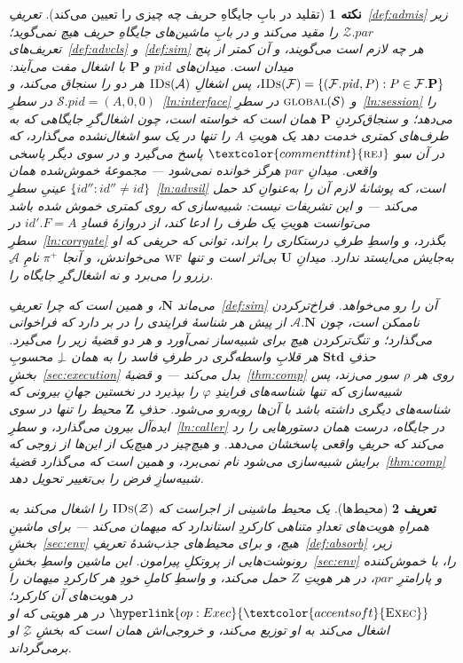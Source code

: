\documentclass[10pt,oneside,openany]{book}
\newcommand{\Ps}{\mathbf{P}}
\newcommand{\PID}{\mathit{pid}}
\newcommand{\admits}{\mathbf{N}}
\newcommand{\Zpid}{\mathbf{Z}}
\newcommand{\Stdpid}{\mathbf{Std}}
\newcommand{\pars}{\mathit{par}}
\newcommand{\uses}{\mathbf{U}}
\newcommand{\WF}{\op{wf}}
\newcommand{\F}{\mathcal{F}}
\newcommand{\Zenv}{\mathcal{Z}}
\newcommand{\Adv}{\mathcal{A}}
\newcommand{\Sim}{\mathcal{S}}
\newcommand{\op}[1]{\textnormal{\textsc{#1}}}
\newcommand{\opl}[1]{\hyperlink{op:#1}{\textcolor{accentsoft}{\op{#1}}}}
\newcommand{\IDs}{\op{IDs}}
\newcommand{\id}{id}
\newcommand{\atom}[1]{\textcolor{commenttint}{\op{#1}}}
\newcommand{\rej}{\atom{rej}}
\newcommand{\none}{\bot}
\theoremstyle{accentdef}
\newtheorem{definition}{تعریف}[chapter]
\newtheorem{remark}[definition]{نکته}
\theoremstyle{accentplain}
\begin{document}
\begin{remark}[تقلید در بابِ جایگاهِ حریف چه چیزی را تعیین می‌کند]\label{rem:advpars}
تعریفِ~\ref{def:admis}ِ زیر $\Zenv.\pars$ را مقید می‌کند و در بابِ
ماشین‌های جایگاهِ حریف هیچ نمی‌گوید؛ تعریف‌های~\ref{def:advcls}
و~\ref{def:sim} هر چه لازم است می‌گویند، و آن کمتر از پنج میدان است.
میدان‌های $\PID$ و $\Ps$ با اشغال مفت می‌آیند: $\IDs(\F) = \{(\F.\PID,P)
: P \in \F.\Ps\}$، پس اشغالِ $\IDs(\Adv)$ هر دو را سنجاق می‌کند، و
$\Sim.\PID = (A,0,0)$ در سطرِ~\ref{ln:interface} و $\op{global}(\Sim)$ در
سطرِ~\ref{ln:session} را می‌دهد؛ و سنجاق‌کردنِ $\Ps$ همان است که خواسته
است، چون اشغال‌گرِ جایگاهی که به طرف‌های کمتری خدمت دهد یک هویتِ $A$ را
تنها در یک سو اشغال‌نشده می‌گذارد، که در آن سو $\rej$ پاسخ می‌گیرد و در
سوی دیگر پاسخی واقعی. میدانِ $\pars$ هرگز خوانده نمی‌شود --- مجموعهٔ
خموش‌شده همان $\{\id'' : \id'' \neq \id\}$ِ عینیِ سطرِ~\ref{ln:advsil}
است، که پوشانهٔ لازم آن را به‌عنوانِ کد حمل می‌کند --- و این تشریفات
نیست: شبیه‌سازی که روی \emph{کمتری} خموش شده باشد می‌توانست هویتِ یک طرف
را ادعا کند، از دروازهٔ فسادِ $\id'.F = A$ در سطرِ~\ref{ln:corrgate}
بگذرد، و واسطِ طرفِ درستکاری را براند، توانی که حریفی که او به‌جایش
می‌ایستد ندارد. میدانِ $\uses$ بی‌اثر است و تنها $\WF$ می‌خواندش، و آنجا
$\pi^{+}$ نامِ $\Adv$ِ رزرو را می‌برد و نه اشغال‌گرِ جایگاه را.

می‌ماند $\admits$، و همین است که چرا تعریفِ~\ref{def:sim} آن را رو
می‌خواهد. فراخ‌ترکردن ناممکن است، چون $\Adv.\admits$ از پیش هر شناسهٔ
فرایندی را در بر دارد که فراخوانی می‌گذارد؛ و تنگ‌ترکردن هیچ برای
شبیه‌ساز نمی‌آورد و هر دو قضیهٔ زیر را می‌گیرد. حذفِ $\Stdpid$ هر قلابِ
واسطه‌گری در طرفِ فاسد را به همان $\none$ِ محسوبِ
بخشِ~\ref{sec:execution} بدل می‌کند --- و قضیهٔ~\ref{thm:comp} روی هر
$\rho$ سور می‌زند، پس شبیه‌سازی که تنها شناسه‌های فرایندِ $\varphi$ را
بپذیرد در نخستین جهانِ بیرونی که شناسه‌های دیگری داشته باشد با آن‌ها
روبه‌رو می‌شود. حذفِ $\Zpid$ محیط را تنها در سوی ایده‌آل بیرون می‌گذارد، و
سطرِ~\ref{ln:caller} در جایگاه، درست همان دستورهایی را رد می‌کند که حریفِ
واقعی پاسخشان می‌دهد. و هیچ‌چیز در هیچ‌یک از این‌ها از زوجی که برایش
شبیه‌سازی می‌شود نام نمی‌برد، و همین است که می‌گذارد
قضیهٔ~\ref{thm:comp} شبیه‌سازِ فرض را بی‌تغییر تحویل دهد.
\end{remark}

\begin{definition}[محیط‌ها]\label{def:env}
یک \emph{محیط} ماشینی از اجراست که $\IDs(\Zenv)$ را اشغال می‌کند به همراهِ
هویت‌های تعدادِ متناهی کارکردِ استاندارد که \emph{میهمان} می‌کند --- برای
ماشینِ بخشِ~\ref{sec:env} هیچ، و برای محیط‌های جذب‌شدهٔ
تعریفِ~\ref{def:absorb}ِ زیر، رونوشت‌هایی از پروتکلِ پیرامون. این ماشین
واسطِ بخشِ~\ref{sec:env} را، با خموش‌کننده و پارامترِ $\pars$، در هر
هویتِ $Z$ حمل می‌کند، و واسطِ کاملِ خودِ هر کارکردِ میهمان را در
هویت‌های آن کارکرد؛ $\opl{Exec}$ در هر هویتی که او اشغال می‌کند به او
توزیع می‌کند، و خروجی‌اش همان است که بخشِ $\Zenv$ِ او برمی‌گرداند.
\end{definition}
\end{document}
